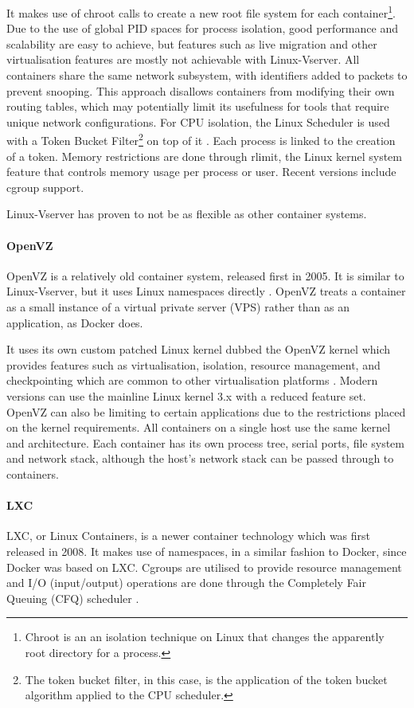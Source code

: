 It makes use of chroot calls to create a new root file system for each container\footnote{Chroot is an an isolation technique on Linux that changes the apparently root directory for a process.}. Due to the use of global PID spaces for process isolation, good performance and scalability are easy to achieve, but features such as live migration and other virtualisation features are mostly not achievable with Linux-Vserver. All containers share the same network subsystem, with identifiers added to packets to prevent snooping. This approach disallows containers from modifying their own routing tables, which may potentially limit its usefulness for tools that require unique network configurations. For CPU isolation, the Linux Scheduler is used with a Token Bucket Filter\footnote{The token bucket filter, in this case, is the application of the token bucket algorithm applied to the CPU scheduler.} on top of it \parencite{soltesz2007container}. Each process is linked to the creation of a token. Memory restrictions are done through rlimit, the Linux kernel system feature that controls memory usage per process or user. Recent versions include cgroup support.

Linux-Vserver has proven to not be as flexible as other container systems.

\paragraph{OpenVZ}
OpenVZ is a relatively old container system, released first in 2005. It is similar to Linux-Vserver, but it uses Linux namespaces directly \parencite{dua2014virtualization}. OpenVZ treats a container as a small instance of a virtual private server (VPS) rather than as an application, as Docker does.

It uses its own custom patched Linux kernel dubbed the OpenVZ kernel which provides features such as virtualisation, isolation, resource management, and checkpointing which are common to other virtualisation platforms \parencite{kolyshkin2006virtualization,che2010synthetical}. Modern versions can use the mainline Linux kernel 3.x with a reduced feature set. OpenVZ can also be limiting to certain applications due to the restrictions placed on the kernel requirements. All containers on a single host use the same kernel and architecture. Each container has its own process tree, serial ports, file system and network stack, although the host's network stack can be passed through to containers.

\paragraph{LXC}
LXC, or Linux Containers, is a newer container technology which was first released in 2008. It makes use of namespaces, in a similar fashion to Docker, since Docker was based on LXC. Cgroups are utilised to provide resource management and I/O (input/output) operations are done through the Completely Fair Queuing (CFQ) scheduler \parencite{rizki2016performance}.

